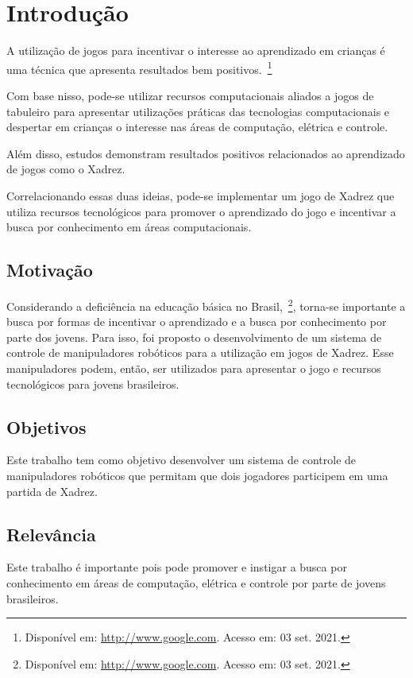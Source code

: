 \chapter[Introdução]{Introdução}
\label{cap:introducao}

A utilização de jogos para incentivar o interesse ao aprendizado em crianças é uma técnica que apresenta resultados bem positivos.~\footnote{Disponível em: \url{http://www.google.com}. Acesso em: 03 set. 2021.}

Com base nisso, pode-se utilizar recursos computacionais aliados a jogos de tabuleiro para apresentar utilizações práticas das tecnologias computacionais e despertar em crianças o interesse nas áreas de computação, elétrica e controle.

Além disso, estudos demonstram resultados positivos relacionados ao aprendizado de jogos como o Xadrez.

Correlacionando essas duas ideias, pode-se implementar um jogo de Xadrez que utiliza recursos tecnológicos para promover o aprendizado do jogo e incentivar a busca por conhecimento em áreas computacionais.

\section[Motivação]{Motivação}

Considerando a deficiência na educação básica no Brasil,~\footnote{Disponível em: \url{http://www.google.com}. Acesso em: 03 set. 2021.}, torna-se importante a busca por formas de incentivar o aprendizado e a busca por conhecimento por parte dos jovens.
Para isso, foi proposto o desenvolvimento de um sistema de controle de manipuladores robóticos para a utilização em jogos de Xadrez. Esse manipuladores podem, então, ser utilizados para apresentar o jogo e recursos tecnológicos para jovens brasileiros.

\section[Objetivos]{Objetivos}

Este trabalho tem como objetivo desenvolver um sistema de controle de manipuladores robóticos que permitam que dois jogadores participem em uma partida de Xadrez.

\section[Relevância]{Relevância}

Este trabalho é importante pois pode promover e instigar a busca por conhecimento em áreas de computação, elétrica e controle por parte de jovens brasileiros.
